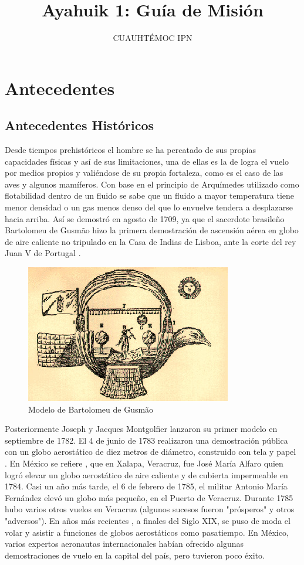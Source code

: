 \documentclass[letterpaper,12pt]{article} %
\title{Ayahuik 1: Guía de Misión}
\author{CUAUHTÉMOC IPN}
\begin{document}
\tableofcontents


\newpage
\section{Antecedentes}

    \subsection{Antecedentes Históricos}
    Desde tiempos prehistóricos el hombre se ha percatado de sus propias capacidades físicas y así de sus limitaciones, una de ellas es la de logra el vuelo por medios propios y valiéndose de su propia fortaleza, como es el caso de las aves y algunos mamíferos.
Con base en el principio de Arquímedes utilizado como flotabilidad dentro de un fluido se sabe que un fluido a mayor temperatura tiene menor densidad o un gas menos denso del que lo envuelve tendera a desplazarse hacia arriba. 
Así se demostró en agosto de 1709, ya que el sacerdote brasileño Bartolomeu de Gusmão hizo la primera demostración de ascensión aérea en globo de aire caliente no tripulado en la Casa de Indias de Lisboa, ante la corte del rey Juan V de Portugal .

\begin{figure}[H]
      \centerline{\includegraphics[width=.6\textwidth]{BG-0000.jpg}}
      \caption{Modelo de Bartolomeu de Gusmão}
      \label{fig:BG}
\end{figure}
Posteriormente Joseph y Jacques Montgolfier lanzaron su primer modelo en septiembre de 1782. El 4 de junio de 1783 realizaron una demostración pública con un globo aerostático de diez metros de diámetro, construido con tela y papel .
En México se refiere , que en Xalapa, Veracruz, fue José María Alfaro quien logró elevar un globo aerostático de aire caliente y de cubierta impermeable en 1784. Casi un año más tarde, el 6 de febrero de 1785, el militar Antonio María Fernández elevó un globo más pequeño, en el Puerto de Veracruz.  Durante 1785 hubo varios otros vuelos en Veracruz (algunos sucesos fueron "prósperos" y otros "adversos").
En años más recientes , a finales  del Siglo XIX,  se puso de moda el volar y asistir a funciones de globos aerostáticos como pasatiempo. En México,  varios expertos aeronautas internacionales habían ofrecido algunas demostraciones de vuelo en la capital del país,  pero tuvieron poco éxito.
\end{document}
